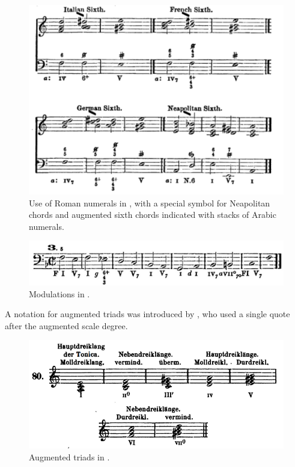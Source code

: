 \begin{figure}
    \centering
    \includegraphics[width=\textwidth]{figures/chapter/2/primary_sources/emery1879elements051.png}
    \caption{Use of Roman numerals in \textcite{emery1879elements}, with a special symbol for Neapolitan chords and augmented sixth chords indicated with stacks of Arabic numerals.}
    \label{fig:emery1879elements051}
\end{figure}

\begin{figure}
    \centering
    \includegraphics[width=\textwidth]{figures/chapter/2/primary_sources/emery1879elements102.png}
    \caption{Modulations in \textcite{emery1879elements}.}
    \label{fig:emery1879elements051}
\end{figure}

A notation for augmented triads was introduced by \textcite{jadassohn1883lehrbuch}, who used a single quote after the augmented scale degree.

\begin{figure}
    \centering
    \includegraphics[width=\textwidth]{figures/chapter/2/primary_sources/jadassohn1883lehrbuch038.png}
    \caption{Augmented triads in \textcite{jadassohn1883lehrbuch}.}
    \label{fig:jadassohn1883lehrbuch038}
\end{figure}

